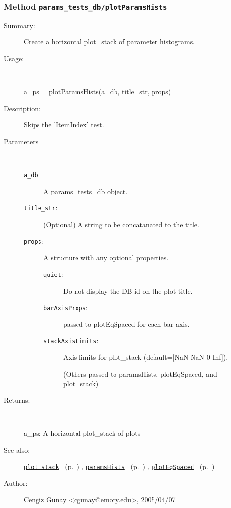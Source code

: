 \subsubsection[Method \texttt{plotParamsHists}]{Method \texttt{params\_tests\_db/plotParamsHists}}%
%
\label{ref_params_tests_db__plotParamsHists}%
\hypertarget{ref_params_tests_db__plotParamsHists}{}%
\begin{description}
\item[Summary:]Create a horizontal plot\_stack of parameter histograms.
%
\item[Usage:]~%
\begin{lyxcode}%
a\_ps = plotParamsHists(a\_db, title\_str, props)
%
\end{lyxcode}%
%
\item[Description:]%
Skips the 'ItemIndex' test.
\item[Parameters:]~
\begin{description}%
\item[\texttt{a\_db}:]
 A params\_tests\_db object.
\item[\texttt{title\_str}:]
 (Optional) A string to be concatanated to the title.
\item[\texttt{props}:]
 A structure with any optional properties.
\begin{description}%
\item[\texttt{quiet}:]
 Do not display the DB id on the plot title.
\item[\texttt{barAxisProps}:]
 passed to plotEqSpaced for each bar axis.
\item[\texttt{stackAxisLimits}:]
 Axis limits for plot\_stack (default=[NaN NaN 0 Inf]).

(Others passed to paramsHists, plotEqSpaced, and plot\_stack)
\end{description}%
\end{description}%
%
\item[Returns:
]~

   a\_ps: A horizontal plot\_stack of plots
%
%
\item[See also:]%
\hyperlink{ref_plot_stack}{\texttt{plot\_stack}}%
\ (p.~\pageref{ref_plot_stack})%
%
, \hyperlink{ref_paramsHists}{\texttt{paramsHists}}%
\ (p.~\pageref{ref_paramsHists})%
%
, \hyperlink{ref_plotEqSpaced}{\texttt{plotEqSpaced}}%
\ (p.~\pageref{ref_plotEqSpaced})%
%
%
\item[Author:]%
Cengiz Gunay <cgunay@emory.edu>, 2005/04/07
%
\end{description}
\methodline%
